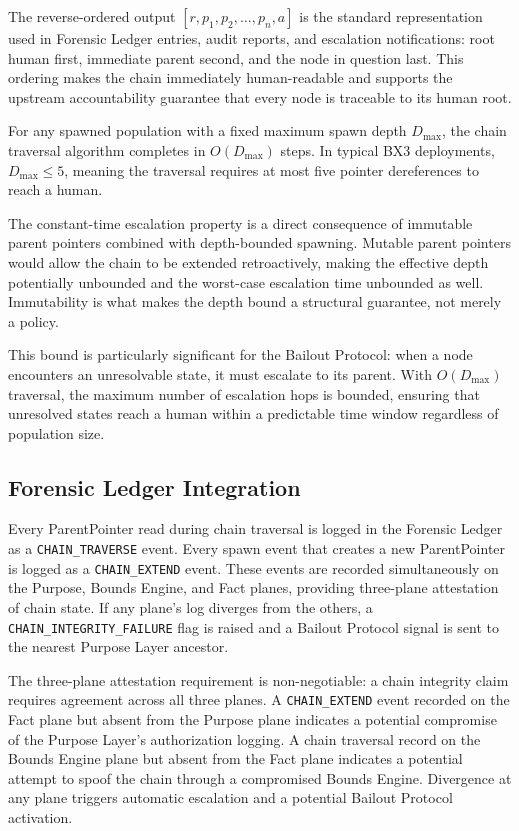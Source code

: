 The reverse-ordered output $[r, p_1, p_2, \dots, p_n, a]$ is the standard representation used in Forensic Ledger entries, audit reports, and escalation notifications: root human first, immediate parent second, and the node in question last. This ordering makes the chain immediately human-readable and supports the upstream accountability guarantee that every node is traceable to its human root.

\begin{property}
For any spawned population with a fixed maximum spawn depth $D_{\max}$, the chain traversal algorithm completes in $O(D_{\max})$ steps. In typical BX3 deployments, $D_{\max} \leq 5$, meaning the traversal requires at most five pointer dereferences to reach a human.
\end{property}

The constant-time escalation property is a direct consequence of immutable parent pointers combined with depth-bounded spawning. Mutable parent pointers would allow the chain to be extended retroactively, making the effective depth potentially unbounded and the worst-case escalation time unbounded as well. Immutability is what makes the depth bound a structural guarantee, not merely a policy.

This bound is particularly significant for the Bailout Protocol: when a node encounters an unresolvable state, it must escalate to its parent. With $O(D_{\max})$ traversal, the maximum number of escalation hops is bounded, ensuring that unresolved states reach a human within a predictable time window regardless of population size.

\subsection{Forensic Ledger Integration}

Every ParentPointer read during chain traversal is logged in the Forensic Ledger as a \texttt{CHAIN\_TRAVERSE} event. Every spawn event that creates a new ParentPointer is logged as a \texttt{CHAIN\_EXTEND} event. These events are recorded simultaneously on the Purpose, Bounds Engine, and Fact planes, providing three-plane attestation of chain state. If any plane's log diverges from the others, a \texttt{CHAIN\_INTEGRITY\_FAILURE} flag is raised and a Bailout Protocol signal is sent to the nearest Purpose Layer ancestor.

The three-plane attestation requirement is non-negotiable: a chain integrity claim requires agreement across all three planes. A \texttt{CHAIN\_EXTEND} event recorded on the Fact plane but absent from the Purpose plane indicates a potential compromise of the Purpose Layer's authorization logging. A chain traversal record on the Bounds Engine plane but absent from the Fact plane indicates a potential attempt to spoof the chain through a compromised Bounds Engine. Divergence at any plane triggers automatic escalation and a potential Bailout Protocol activation.


